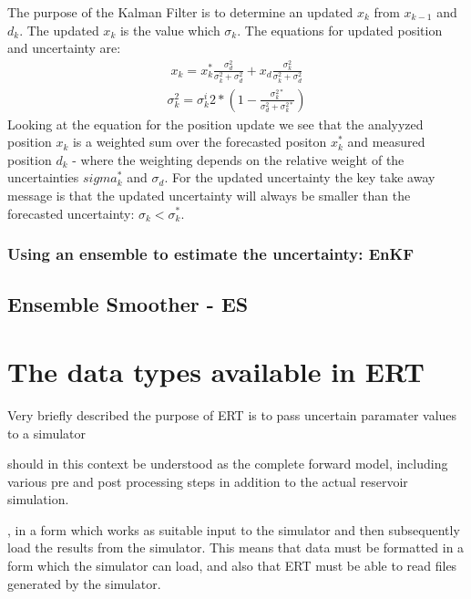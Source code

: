 \documentclass[letterpaper,10pt,english]{sphinxmanual}
\begin{document}
The purpose of the Kalman Filter is to determine an updated \(x_k\) from
\(x_{k-1}\) and \(d_k\). The updated \(x_k\) is the value which
 \(\sigma_k\). The equations for updated position
and uncertainty are:
\begin{equation*}
\begin{split}x_k = x_k^{\ast}\frac{\sigma_d^2}{\sigma_k^2 + \sigma_d^2} + x_d
\frac{\sigma_k^2}{\sigma_k^2 + \sigma_d^2}\end{split}
\end{equation*}\begin{equation*}
\begin{split}\sigma_k^2 = \sigma_k^i{2\ast}\left(1 - \frac{\sigma_k^{2\ast}}{\sigma_d^2 + \sigma_k^{2\ast}}\right)\end{split}
\end{equation*}
Looking at the equation for the position update we see that the analyyzed
position \(x_k\) is a weighted sum over the forecasted positon
\(x_k^{\ast}\) and measured position \(d_k\) - where the weighting
depends on the relative weight of the uncertainties \(sigma_k^{\ast}\) and
\(\sigma_d\). For the updated uncertainty the key take away message is that
the updated uncertainty will always be smaller than the forecasted uncertainty:
\(\sigma_k < \sigma_k^{\ast}\).


\subsection{Using an ensemble to estimate the uncertainty: EnKF}
\label{\detokenize{introduction/index:using-an-ensemble-to-estimate-the-uncertainty-enkf}}

\section{Ensemble Smoother - ES}
\label{\detokenize{introduction/index:ensemble-smoother-es}}

\chapter{The data types available in ERT}
\label{\detokenize{data_types/index:the-data-types-available-in-ert}}\label{\detokenize{data_types/index::doc}}
Very briefly described the purpose of ERT is to pass uncertain paramater values
to a simulator %
\begin{footnote}[1]\sphinxAtStartFootnote
{} should in this context be understood as the complete
forward model, including various pre and post processing steps in
addition to the actual reservoir simulation.
%
\end{footnote}, in a form which works as suitable input to the simulator and
then subsequently load the results from the simulator. This means that data must
be formatted in a form which the simulator can load, and also that ERT must be
able to read files generated by the simulator.
\end{document}
